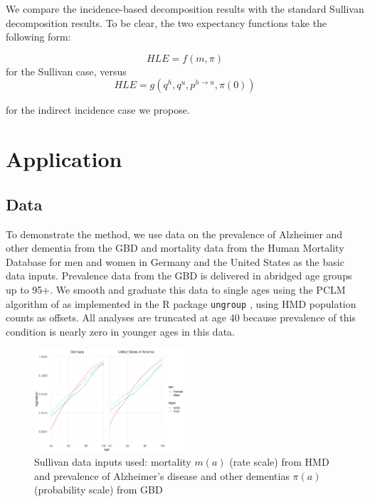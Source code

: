 \documentclass[sn-apa]{sn-jnl}%
\theoremstyle{thmstyleone}%
\theoremstyle{thmstyletwo}%
\theoremstyle{thmstylethree}%
\begin{document}
We compare the incidence-based decomposition results with the standard Sullivan decomposition results. To be clear, the two expectancy functions take the following form:

\begin{equation}
HLE = f(m,\pi) 
\end{equation}
for the Sullivan case, versus
\begin{equation}
HLE = g(q^h,q^u,p^{h \rightarrow u},\pi(0)) 
\end{equation}

for the indirect incidence case we propose.


\section{Application}\label{app}
\subsection{Data}\label{data}
To demonstrate the method, we use data on the prevalence of Alzheimer and other dementia from the GBD \citep{ihme1} and mortality data from the Human Mortality Database \citep{barbieri2015data} for men and women in Germany and the United States as the basic data inputs. Prevalence data from the GBD is delivered in abridged age groups up to 95+. We smooth and graduate this data to single ages using the PCLM algorithm of \citet{rizzi2015efficient} as implemented in the R package \texttt{ungroup} \citep{ungroup}, using HMD population counts as offsets. All analyses are truncated at age 40 because prevalence of this condition is nearly zero in younger ages in this data.

\begin{figure}[ht!]
\centering
\caption{Sullivan data inputs used: mortality $m(a)$ (rate scale) from HMD and prevalence of Alzheimer's disease and other dementias $\pi(a)$ (probability scale) from GBD}
\label{fig:sull_inputs}
\includegraphics[width=0.5\textwidth]{fig1.pdf}
\end{figure}
\end{document}
